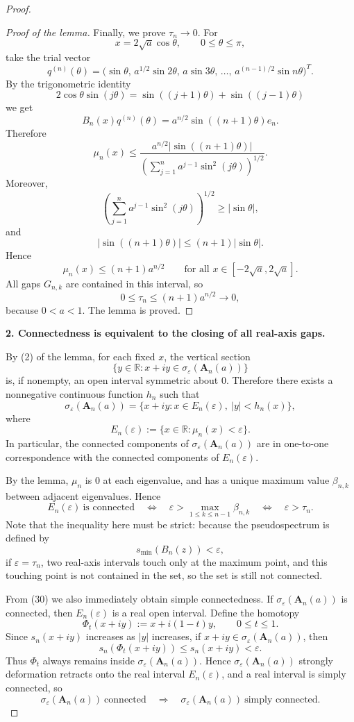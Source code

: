 \documentclass[11pt]{article}
\newcommand{\R}{\mathbb R}
\newcommand{\eps}{\varepsilon}
\newcommand{\A}{\mathbf A}
\begin{document}
\begin{proof}
\begin{proof}[Proof of the lemma]
Finally, we prove \(\tau_n\to0\). For
\[
x=2\sqrt a\cos\theta,\qquad 0\le\theta\le\pi,
\]
take the trial vector
\[
q^{(n)}(\theta)
=
\bigl(
\sin\theta,\,
a^{1/2}\sin2\theta,\,
a\sin3\theta,\,
\dots,\,
a^{(n-1)/2}\sin n\theta
\bigr)^T.
\tag{24}
\]
By the trigonometric identity
\[
2\cos\theta\sin(j\theta)=\sin((j+1)\theta)+\sin((j-1)\theta)
\]
we get
\[
B_n(x)q^{(n)}(\theta)
=
a^{n/2}\sin((n+1)\theta)e_n.
\tag{25}
\]
Therefore
\[
\mu_n(x)
\le
\frac{
a^{n/2}|\sin((n+1)\theta)|
}{
\left(\sum_{j=1}^n a^{j-1}\sin^2(j\theta)\right)^{1/2}
}.
\tag{26}
\]
Moreover,
\[
\left(\sum_{j=1}^n a^{j-1}\sin^2(j\theta)\right)^{1/2}
\ge |\sin\theta|,
\tag{27}
\]
and
\[
|\sin((n+1)\theta)|\le (n+1)|\sin\theta|.
\tag{28}
\]
Hence
\[
\mu_n(x)\le (n+1)a^{n/2}
\qquad
\text{for all }x\in[-2\sqrt a,2\sqrt a].
\tag{29}
\]
All gaps \(G_{n,k}\) are contained in this interval, so
\[
0\le\tau_n\le (n+1)a^{n/2}\longrightarrow0,
\]
because \(0<a<1\). The lemma is proved.
\end{proof}

\medskip

\noindent\textbf{2. Connectedness is equivalent to the closing of all real-axis gaps.}

By (2) of the lemma, for each fixed \(x\), the vertical section
\[
\{y\in\R:x+iy\in\sigma_\eps(\A_n(a))\}
\]
is, if nonempty, an open interval symmetric about \(0\). Therefore there exists a nonnegative continuous function \(h_n\) such that
\[
\sigma_\eps(\A_n(a))
=
\{x+iy:x\in E_n(\eps),\ |y|<h_n(x)\},
\tag{30}
\]
where
\[
E_n(\eps):=\{x\in\R:\mu_n(x)<\eps\}.
\tag{31}
\]
In particular, the connected components of \(\sigma_\eps(\A_n(a))\) are in one-to-one correspondence with the connected components of \(E_n(\eps)\).

By the lemma, \(\mu_n\) is \(0\) at each eigenvalue, and has a unique maximum value \(\beta_{n,k}\) between adjacent eigenvalues. Hence
\[
E_n(\eps)\ \text{is connected}
\quad\Longleftrightarrow\quad
\eps>\max_{1\le k\le n-1}\beta_{n,k}
\quad\Longleftrightarrow\quad
\eps>\tau_n.
\tag{32}
\]
Note that the inequality here must be strict: because the pseudospectrum is defined by
\[
s_{\min}(B_n(z))<\eps,
\]
if \(\eps=\tau_n\), two real-axis intervals touch only at the maximum point, and this touching point is not contained in the set, so the set is still not connected.

From (30) we also immediately obtain simple connectedness. If \(\sigma_\eps(\A_n(a))\) is connected, then \(E_n(\eps)\) is a real open interval. Define the homotopy
\[
\Phi_t(x+iy):=x+i(1-t)y,\qquad 0\le t\le1.
\tag{33}
\]
Since \(s_n(x+iy)\) increases as \(|y|\) increases, if \(x+iy\in\sigma_\eps(\A_n(a))\), then
\[
s_n(\Phi_t(x+iy))\le s_n(x+iy)<\eps.
\]
Thus \(\Phi_t\) always remains inside \(\sigma_\eps(\A_n(a))\). Hence \(\sigma_\eps(\A_n(a))\) strongly deformation retracts onto the real interval \(E_n(\eps)\), and a real interval is simply connected, so
\[
\sigma_\eps(\A_n(a))\ \text{connected}
\quad\Longrightarrow\quad
\sigma_\eps(\A_n(a))\ \text{simply connected}.
\tag{34}
\]


\end{proof}
\end{document}
